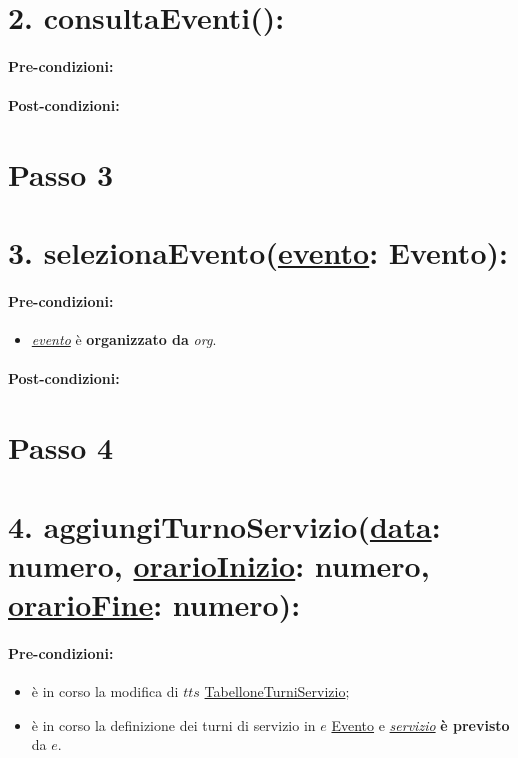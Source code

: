 \section*{2. consultaEventi():}

\paragraph{Pre-condizioni:}

\paragraph{Post-condizioni:}


\section{Passo 3}
\section*{3. selezionaEvento(\underline{evento}: Evento):}

\paragraph{Pre-condizioni:}
\begin{itemize}
     \item \underline{\textit{evento}} è \textbf{organizzato da} {\textit{org}}.
\end{itemize}

\paragraph{Post-condizioni:}

\section{Passo 4}
\section*{4. aggiungiTurnoServizio(\underline{data}: numero, \underline{orarioInizio}: numero, \underline{orarioFine}: numero):}

\paragraph{Pre-condizioni:}
\begin{itemize}
    \item è in corso la modifica di $tts$ \underline{TabelloneTurniServizio};
    \item è in corso la definizione dei turni di servizio in $e$ \underline{Evento} e \underline{\textit{servizio}} \textbf{è previsto} da $e$.
\end{itemize}

